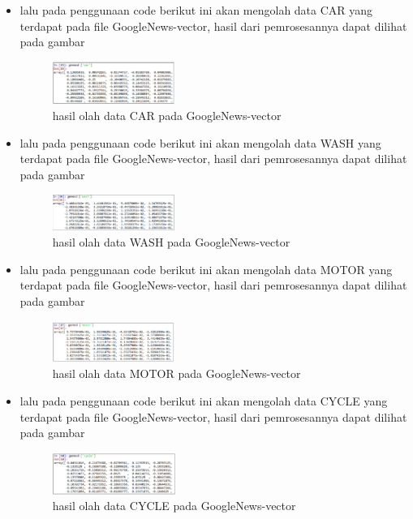 \begin{enumerate}
\begin{itemize}
\item lalu pada penggunaan code berikut ini akan mengolah data CAR yang terdapat pada file GoogleNews-vector, hasil dari pemrosesannya dapat dilihat pada gambar
\begin{figure}[H]
\includegraphics[width=4cm]{figures/1174002/chapter5/9.png}
\centering
\caption{hasil olah data CAR pada GoogleNews-vector}
\end{figure}

\item lalu pada penggunaan code berikut ini akan mengolah data WASH yang terdapat pada file GoogleNews-vector, hasil dari pemrosesannya dapat dilihat pada gambar
\begin{figure}[H]
\includegraphics[width=4cm]{figures/1174002/chapter5/10.png}
\centering
\caption{hasil olah data WASH pada GoogleNews-vector}
\end{figure}

\item lalu pada penggunaan code berikut ini akan mengolah data MOTOR yang terdapat pada file GoogleNews-vector, hasil dari pemrosesannya dapat dilihat pada gambar 
\begin{figure}[H]
\includegraphics[width=4cm]{figures/1174002/chapter5/11.png}
\centering
\caption{hasil olah data MOTOR pada GoogleNews-vector}
\end{figure}

\item lalu pada penggunaan code berikut ini akan mengolah data CYCLE yang terdapat pada file GoogleNews-vector, hasil dari pemrosesannya dapat dilihat pada gambar
\begin{figure}[H]
\includegraphics[width=4cm]{figures/1174002/chapter5/12.png}
\centering
\caption{hasil olah data CYCLE pada GoogleNews-vector}
\end{figure}


\end{itemize}
\end{enumerate}
